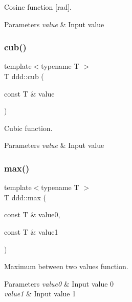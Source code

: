 Cosine function \mbox{[}rad\mbox{]}. 


\begin{DoxyParams}{Parameters}
{\em value} & Input value \\
\hline
\end{DoxyParams}
\mbox{\label{namespaceddd_abbdb4782fa0a78950fd49de0d5766dd2}} 
\subsubsection{\texorpdfstring{cub()}{cub()}}
{\footnotesize\ttfamily template$<$typename T $>$ \\
T ddd\+::cub (\begin{DoxyParamCaption}\item[{const T \&}]{value }\end{DoxyParamCaption})\hspace{0.3cm}{\ttfamily [inline]}}



Cubic function. 


\begin{DoxyParams}{Parameters}
{\em value} & Input value \\
\hline
\end{DoxyParams}
\mbox{\label{namespaceddd_ac22862b5ed1b5bf5ba4d52e4a740bef9}} 
\subsubsection{\texorpdfstring{max()}{max()}\hspace{0.1cm}{\footnotesize\ttfamily [1/2]}}
{\footnotesize\ttfamily template$<$typename T $>$ \\
T ddd\+::max (\begin{DoxyParamCaption}\item[{const T \&}]{value0,  }\item[{const T \&}]{value1 }\end{DoxyParamCaption})\hspace{0.3cm}{\ttfamily [inline]}}



Maximum between two values function. 


\begin{DoxyParams}{Parameters}
{\em value0} & Input value 0 \\
\hline
{\em value1} & Input value 1 \\
\hline
\end{DoxyParams}
\mbox{\label{namespaceddd_a64cb844784cf8f7a2a9d691f7c6bcba3}} 

